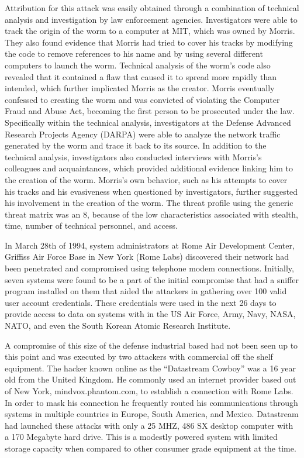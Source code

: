 \documentclass[12pt]{report}
\begin{document}
Attribution for this attack was easily obtained through a combination of technical analysis and investigation by law enforcement agencies.  Investigators were able to track the origin of the worm to a computer at MIT, which was owned by Morris. They also found evidence that Morris had tried to cover his tracks by modifying the code to remove references to his name and by using several different computers to launch the worm. Technical analysis of the worm's code also revealed that it contained a flaw that caused it to spread more rapidly than intended, which further implicated Morris as the creator.  Morris eventually confessed to creating the worm and was convicted of violating the Computer Fraud and Abuse Act, becoming the first person to be prosecuted under the law.  Specifically within the technical analysis, investigators at the Defense Advanced Research Projects Agency (DARPA) were able to analyze the network traffic generated by the worm and trace it back to its source.  In addition to the technical analysis, investigators also conducted interviews with Morris's colleagues and acquaintances, which provided additional evidence linking him to the creation of the worm. Morris's own behavior, such as his attempts to cover his tracks and his evasiveness when questioned by investigators, further suggested his involvement in the creation of the worm.  The threat profile using the generic threat matrix was an 8, because of the low characteristics associated with stealth, time, number of technical personnel, and access.  \cite{brassardmorris}  

In March 28th of 1994, system administrators at Rome Air Development Center, Griffiss Air Force Base in New York (Rome Labs) discovered their network had been penetrated and compromised using telephone modem connections.  Initially, seven systems were found to be a part of the initial compromise that had a sniffer program installed on them that aided the attackers in gathering over 100 valid user account credentials.  These credentials were used in the next 26 days to provide access to data on systems with in the US Air Force, Army, Navy, NASA, NATO, and even the South Korean Atomic Research Institute.     

A compromise of this size of the defense industrial based had not been seen up to this point and was executed by two attackers with commercial off the shelf equipment.  The hacker known online as the “Datastream Cowboy” was a 16 year old from the United Kingdom.  He commonly used an internet provider based out of New York, mindvox.phantom.com, to establish a connection with Rome Labs.  In order to mask his connection he frequently routed his communications through systems in multiple countries in Europe, South America, and Mexico.  Datastream had launched these attacks with only a 25 MHZ, 486 SX desktop computer with a 170 Megabyte hard drive.  This is a modestly powered system with limited storage capacity when compared to other consumer grade equipment at the time.
\end{document}
